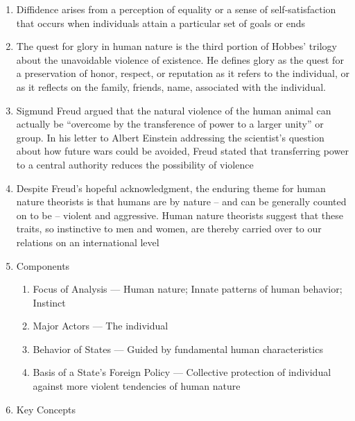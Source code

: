 \documentclass[12pt]{article}
\begin{document}
\begin{enumerate}
      \item Diffidence arises from a perception of equality or a sense of self-satisfaction that occurs when individuals attain a particular set of goals or ends

      \item The quest for glory in human nature is the third portion of Hobbes’ trilogy about the unavoidable violence of existence. He defines glory as the quest for a preservation of honor, respect, or reputation as it refers to the individual, or as it reflects on the family, friends, name, associated with the individual.

      \item Sigmund Freud argued that the natural violence of the human animal can actually be “overcome by the transference of power to a larger unity” or group. In his letter to Albert Einstein addressing the scientist’s question about how future wars could be avoided, Freud stated that transferring power to a central authority reduces the possibility of violence

      \item Despite Freud’s hopeful acknowledgment, the enduring theme for human nature theorists is that humans are by nature – and can be generally counted on to be – violent and aggressive. Human nature theorists suggest that these traits, so instinctive to men and women, are thereby carried over to our relations on an international level

      \item Components

        \begin{enumerate}

          \item Focus of Analysis — Human nature; Innate patterns of human behavior; Instinct

          \item Major Actors — The individual

          \item Behavior of States — Guided by fundamental human characteristics

          \item Basis of a State's Foreign Policy — Collective protection of individual against more violent tendencies of human nature

        \end{enumerate}

      \item Key Concepts


\end{enumerate}
\end{document}
